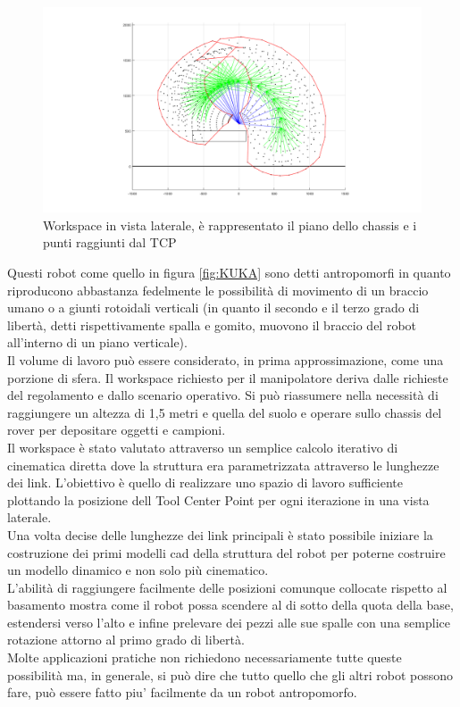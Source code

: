 \documentclass[%
corpo=11pt,
twoside,
 stile=classica,
oldstyle,
greek,%
]{toptesi}
\begin{document}
\begin{figure}
	\centering
	\includegraphics[width=1\textwidth]{Plots/workspace.png}
	\caption{Workspace in vista laterale, è rappresentato il piano dello chassis e i punti raggiunti dal TCP}
	\label{fig:workspace}
\end{figure}
Questi robot come quello in figura \ref{fig:KUKA} sono detti antropomorfi in quanto riproducono abbastanza fedelmente le possibilità di movimento di un braccio umano o a giunti rotoidali verticali (in quanto il secondo e il terzo grado di libertà, detti rispettivamente spalla e gomito, muovono il braccio del robot all'interno di un piano verticale).\\ 
Il volume di lavoro può essere considerato, in prima approssimazione, come una porzione di sfera.
Il workspace richiesto per il manipolatore deriva dalle richieste del regolamento e dallo scenario operativo. Si può riassumere nella necessità di raggiungere un altezza di 1,5 metri e quella del suolo e operare sullo chassis del rover per depositare oggetti e campioni. \\
Il workspace è stato valutato attraverso un semplice calcolo iterativo di cinematica diretta dove la struttura era parametrizzata attraverso le lunghezze dei link. L'obiettivo è quello di realizzare uno spazio di lavoro sufficiente plottando la posizione dell Tool Center Point per ogni iterazione in una vista laterale. \\
Una volta decise delle lunghezze dei link principali è stato possibile iniziare la costruzione dei primi modelli cad della struttura del robot per poterne costruire un modello dinamico e non solo più cinematico. 
\\
L'abilità di raggiungere facilmente delle posizioni comunque collocate rispetto al basamento mostra come il robot possa scendere al di sotto della quota della base, estendersi verso l'alto  e infine prelevare dei pezzi alle sue spalle con una semplice rotazione attorno al primo grado di libertà. \\
Molte applicazioni pratiche non richiedono necessariamente tutte queste possibilità ma, in generale, si può dire che tutto quello che gli altri robot possono fare, può essere fatto piu' facilmente da un robot antropomorfo.\\
\end{document}
